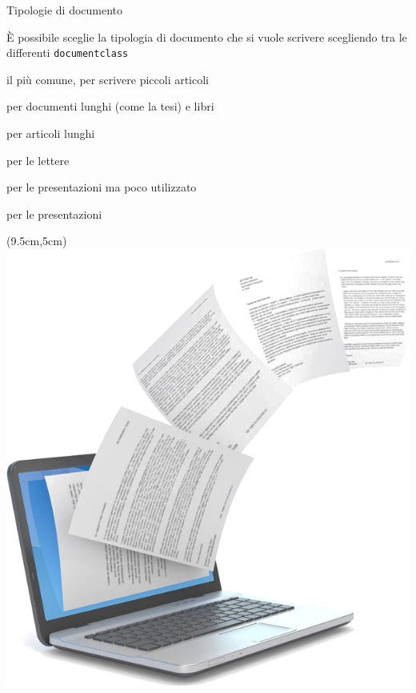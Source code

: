 \begin{frame}{Tipologie di documento}

È possibile sceglie la tipologia di documento che si vuole scrivere scegliendo 
tra le differenti \texttt{documentclass} 

\begin{description}
	\item <2->[\textbf{article}] il più comune, per scrivere piccoli articoli
	\item <3->[\textbf{book}] per documenti lunghi (come la tesi) e libri
	\item <4->[\textbf{report}] per articoli lunghi
	\item <5->[\textbf{letter}] per le lettere
	\item <6->[\textbf{slide}] per le presentazioni ma poco utilizzato
	\item <7->[\textbf{beamer}] per le presentazioni
\end{description}

\begin{textblock*}{5cm}(9.5cm,5cm)
      \includegraphics[scale=0.50]{res/images/tipidocumento}
\end{textblock*}

\end{frame}